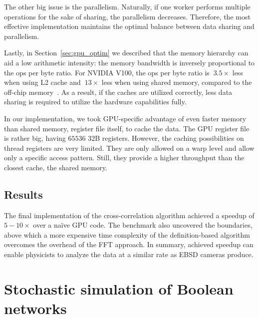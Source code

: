 The other big issue is the parallelism. Naturally, if one worker performs multiple operations for the sake of sharing, the parallelism decreases. Therefore, the most effective implementation maintains the optimal balance between data sharing and parallelism.

Lastly, in Section~\ref{sec:gpu_optim} we described that the memory hierarchy can aid a low arithmetic intensity: the memory bandwidth is inversely proportional to the ops per byte ratio. For NVIDIA V100, the ops per byte ratio is $~3.5\times$ less when using L2 cache and $~13\times$ less when using shared memory, compared to the off-chip memory~\cite{jia2018dissecting}. As a result, if the caches are utilized correctly, less data sharing is required to utilize the hardware capabilities fully.

In our implementation, we took GPU-specific advantage of even faster memory than shared memory, register file itself, to cache the data. The GPU register file is rather big, having $65536$ $32$B registers. However, the caching possibilities on thread registers are very limited. They are only allowed on a warp level and allow only a specific access pattern. Still, they provide a higher throughput than the closest cache, the shared memory.

\subsection{Results}

The final implementation of the cross-correlation algorithm achieved a speedup of $5-10\times$ over a na\"{i}ve GPU code. The benchmark also uncovered the boundaries, above which a more expensive time complexity of the definition-based algorithm overcomes the overhead of the FFT approach. In summary, achieved speedup can enable physicists to analyze the data at a similar rate as EBSD cameras produce.


\section{Stochastic simulation of Boolean networks}
\label{sec:maboss}



